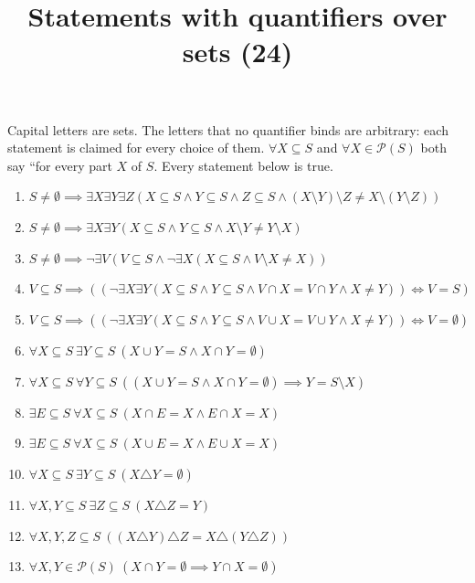 \documentclass[11pt,a4paper]{article}
\title{Statements with quantifiers over sets (24)}
\author{}
\date{}
\begin{document}
\maketitle
Capital letters are sets. The letters that no quantifier binds are arbitrary: each statement is claimed for every choice of them. $\forall X \subseteq S$ and $\forall X \in \mathcal{P}(S)$ both say ``for every part $X$ of $S$. Every statement below is true.

\begin{enumerate}
\item $\displaystyle S \neq \emptyset \implies \exists X \exists Y \exists Z (X \subseteq S \land Y \subseteq S \land Z \subseteq S \land (X \setminus Y) \setminus Z \neq X \setminus (Y \setminus Z))$
\item $\displaystyle S \neq \emptyset \implies \exists X \exists Y (X \subseteq S \land Y \subseteq S \land X \setminus Y \neq Y \setminus X)$
\item $\displaystyle S \neq \emptyset \implies \lnot \exists V (V \subseteq S \land \lnot \exists X (X \subseteq S \land V \setminus X \neq X))$
\item $\displaystyle V \subseteq S \implies ((\lnot \exists X \exists Y (X \subseteq S \land Y \subseteq S \land V \cap X = V \cap Y \land X \neq Y)) \iff V = S)$
\item $\displaystyle V \subseteq S \implies ((\lnot \exists X \exists Y (X \subseteq S \land Y \subseteq S \land V \cup X = V \cup Y \land X \neq Y)) \iff V = \emptyset)$
\item $\displaystyle \forall X \subseteq S\ \exists Y \subseteq S\ (X \cup Y = S \land X \cap Y = \emptyset)$
\item $\displaystyle \forall X \subseteq S\ \forall Y \subseteq S\ ((X \cup Y = S \land X \cap Y = \emptyset) \implies Y = S \setminus X)$
\item $\displaystyle \exists E \subseteq S\ \forall X \subseteq S\ (X \cap E = X \land E \cap X = X)$
\item $\displaystyle \exists E \subseteq S\ \forall X \subseteq S\ (X \cup E = X \land E \cup X = X)$
\item $\displaystyle \forall X \subseteq S\ \exists Y \subseteq S\ (X \triangle Y = \emptyset)$
\item $\displaystyle \forall X, Y \subseteq S\ \exists Z \subseteq S\ (X \triangle Z = Y)$
\item $\displaystyle \forall X, Y, Z \subseteq S\ ((X \triangle Y) \triangle Z = X \triangle (Y \triangle Z))$
\item $\displaystyle \forall X, Y \in \mathcal{P}(S)\ (X \cap Y = \emptyset \implies Y \cap X = \emptyset)$

\end{enumerate}
\end{document}
